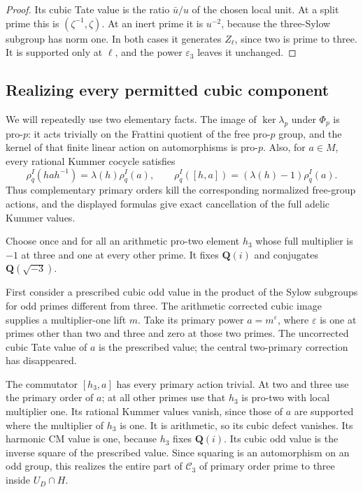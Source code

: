 \begin{proof}
Its cubic Tate value is the ratio \(\bar u/u\) of the
chosen local unit.
At a split prime this is \((\zeta^{-1},\zeta)\).
At an inert prime it is \(u^{-2}\), because the
three-Sylow subgroup has norm one.
In both cases it generates \(Z_\ell\), since two is
prime to three. It is supported only at \(\ell\), and
the power \(\varepsilon_3\) leaves it unchanged.
\end{proof}

\subsection{Realizing every permitted cubic component}

We will repeatedly use two elementary facts.
The image of \(\ker\lambda_p\) under \(\Phi_p\) is pro-\(p\):
it acts trivially on the Frattini quotient of the free
pro-\(p\) group, and the kernel of that finite linear action
on automorphisms is pro-\(p\).
Also, for \(a\in M\), every rational Kummer cocycle satisfies
\[
 \rho_q^I(hah^{-1})=\lambda(h)\rho_q^I(a),\qquad
 \rho_q^I([h,a])=(\lambda(h)-1)\rho_q^I(a).
\]
Thus complementary primary orders kill the corresponding
normalized free-group actions, and the displayed formulas
give exact cancellation of the full adelic Kummer values.

Choose once and for all an arithmetic pro-two element
\(h_3\) whose full multiplier is \(-1\) at three and one
at every other prime. It fixes \(\mathbf Q(i)\) and
conjugates \(\mathbf Q(\sqrt{-3})\).

First consider a prescribed cubic odd value in the product of the Sylow subgroups for odd primes
different from three.
The arithmetic corrected cubic image supplies a
multiplier-one lift \(m\).
Take its primary power \(a=m^\varepsilon\), where
\(\varepsilon\) is one at primes other than two and three
and zero at those two primes.
The uncorrected cubic Tate value of \(a\) is the prescribed
value; the central two-primary correction has disappeared.

The commutator \([h_3,a]\) has every primary action trivial.
At two and three use the primary order of \(a\); at all
other primes use that \(h_3\) is pro-two with local
multiplier one.
Its rational Kummer values vanish, since those of \(a\)
are supported where the multiplier of \(h_3\) is one.
It is arithmetic, so its cubic defect vanishes.
Its harmonic CM value is one, because \(h_3\) fixes
\(\mathbf Q(i)\). Its cubic odd value is the inverse
square of the prescribed value.
Since squaring is an automorphism on an odd group, this
realizes the entire part of \(\mathcal C_3\) of primary
order prime to three inside \(U_D\cap H\).

